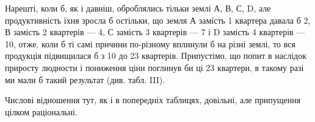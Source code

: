 Нарешті, коли б, як і давніш, оброблялись тільки землі А, В, С, D, але продуктивність їхня зросла б
остільки, що земля А замість 1 квартера давала б 2, В замість 2 квартерів — 4,
С замість 3 квартерів — 7 і D замість 4 квартерів — 10, отже, коли б ті самі
причини по-різному вплинули б на різні землі, то вся продукція підвищилася
б з 10 до 23 квартерів. Припустімо, що попит в наслідок приросту
людности і пониження ціни поглинув би ці 23 квартери, в такому разі ми
мали б такий результат (див. табл. III).

Числові відношення тут, як і в попередніх таблицях, довільні, але припущення
цілком раціональні.

